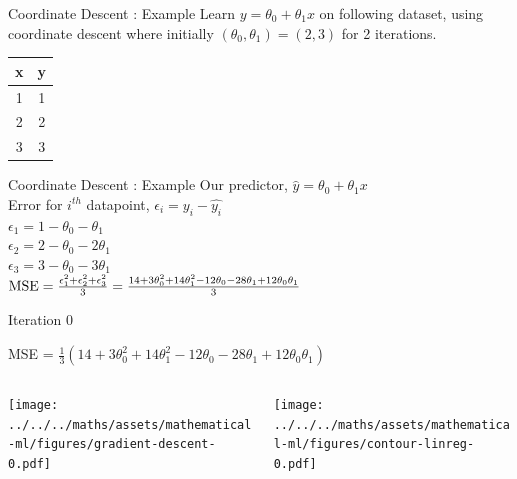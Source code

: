 \documentclass{beamer}
\begin{document}
\begin{frame}{Coordinate Descent : Example}
Learn $y = \theta_0 + \theta_1 x$ on following dataset, using coordinate descent where initially $(\theta_0, \theta_1) = (2,3)$  for 2 iterations. 
\begin{table}[]
\centering
\label{tab:my-table}
\begin{tabular}{|c|c|}
\hline
\textbf{x} & \textbf{y} \\ \hline
1 & 1 \\ \hline
2 & 2 \\ \hline
3 & 3 \\ \hline
\end{tabular}
\end{table}
\end{frame}



\begin{frame}{Coordinate Descent : Example}
Our predictor, $\hat{y} = \theta_0 + \theta_1x$\\
\vspace{1cm}
Error for $i^{th}$ datapoint, $\epsilon_i = y_i - \hat{y_i}$\\
$\epsilon_1 = 1 - \theta_0 - \theta_1$ \\
$\epsilon_2 = 2 - \theta_0 - 2\theta_1$ \\
$\epsilon_3 = 3 - \theta_0 - 3\theta_1$ \\

\vspace{1cm}
$\operatorname{MSE} = \frac{\epsilon_1^2 + \epsilon_2^2 + \epsilon_3^2}{3} = \frac{14 + 3\theta_0^2 + 14\theta_1^2 -12\theta_0 - 28\theta_1 + 12\theta_0\theta_1}{3}$\\
\end{frame}





\begin{frame}{Iteration 0}

MSE = $\frac{1}{3}(14+3\theta_{0}^{2}+14\theta_{1}^{2}-12\theta_{0}-28\theta_{1}+12\theta_{0}\theta_{1})$\\

\begin{columns}
\begin{column}{0.6\textwidth}
\begin{adjustbox}{max totalsize={\textwidth},center}
\texttt{[image: ../../../maths/assets/mathematical-ml/figures/gradient-descent-0.pdf]}
\end{adjustbox}

\end{column}
\begin{column}{0.5\textwidth}
\begin{adjustbox}{max totalsize={\textwidth},center}
\texttt{[image: ../../../maths/assets/mathematical-ml/figures/contour-linreg-0.pdf]}
\end{adjustbox}
\end{column}
\end{columns}




\end{frame}
\end{document}

